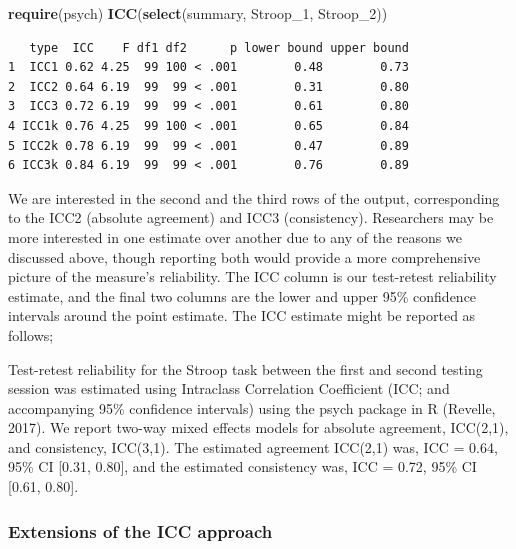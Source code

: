 \documentclass[english,,man,floatsintext]{apa6}
\newenvironment{Shaded}{\begin{snugshade}}{\end{snugshade}}
\newcommand{\DecValTok}[1]{\textcolor[rgb]{0.00,0.00,0.81}{#1}}
\newcommand{\KeywordTok}[1]{\textcolor[rgb]{0.13,0.29,0.53}{\textbf{#1}}}
\newcommand{\NormalTok}[1]{#1}
\begin{document}
\begin{Shaded}
\begin{Highlighting}[]
\KeywordTok{require}\NormalTok{(psych)}
\KeywordTok{ICC}\NormalTok{(}\KeywordTok{select}\NormalTok{(summary, Stroop_}\DecValTok{1}\NormalTok{, Stroop_}\DecValTok{2}\NormalTok{))}
\end{Highlighting}
\end{Shaded}

\begin{verbatim}
   type  ICC    F df1 df2      p lower bound upper bound
1  ICC1 0.62 4.25  99 100 < .001        0.48        0.73
2  ICC2 0.64 6.19  99  99 < .001        0.31        0.80
3  ICC3 0.72 6.19  99  99 < .001        0.61        0.80
4 ICC1k 0.76 4.25  99 100 < .001        0.65        0.84
5 ICC2k 0.78 6.19  99  99 < .001        0.47        0.89
6 ICC3k 0.84 6.19  99  99 < .001        0.76        0.89
\end{verbatim}

We are interested in the second and the third rows of the output, corresponding to the ICC2 (absolute agreement) and ICC3 (consistency). Researchers may be more interested in one estimate over another due to any of the reasons we discussed above, though reporting both would provide a more comprehensive picture of the measure's reliability. The ICC column is our test-retest reliability estimate, and the final two columns are the lower and upper 95\% confidence intervals around the point estimate. The ICC estimate might be reported as follows;

Test-retest reliability for the Stroop task between the first and second testing session was estimated using Intraclass Correlation Coefficient (ICC; and accompanying 95\% confidence intervals) using the psych package in R (Revelle, 2017). We report two-way mixed effects models for absolute agreement, ICC(2,1), and consistency, ICC(3,1). The estimated agreement ICC(2,1) was, ICC = 0.64, 95\% CI {[}0.31, 0.80{]}, and the estimated consistency was, ICC = 0.72, 95\% CI {[}0.61, 0.80{]}.

\hypertarget{extensions-of-the-icc-approach}{%
\subsubsection{Extensions of the ICC approach}\label{extensions-of-the-icc-approach}}
\end{document}
